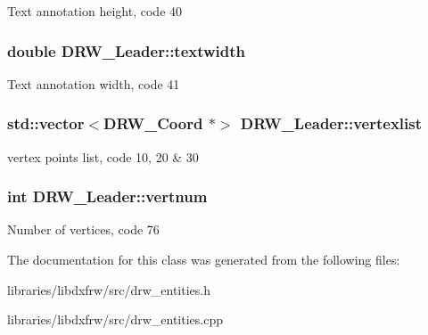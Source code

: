 Text annotation height, code 40 \hypertarget{classDRW__Leader_ab08450146f7f0658eca773a534d64be0}{
\subsubsection[{textwidth}]{\setlength{\rightskip}{0pt plus 5cm}double D\-R\-W\-\_\-\-Leader\-::textwidth}}\label{classDRW__Leader_ab08450146f7f0658eca773a534d64be0}
Text annotation width, code 41 \hypertarget{classDRW__Leader_a7aef5bd8c0202b0c6836e15552866fcd}{
\subsubsection[{vertexlist}]{\setlength{\rightskip}{0pt plus 5cm}std\-::vector$<${\bf D\-R\-W\-\_\-\-Coord} $\ast$$>$ D\-R\-W\-\_\-\-Leader\-::vertexlist}}\label{classDRW__Leader_a7aef5bd8c0202b0c6836e15552866fcd}
vertex points list, code 10, 20 \& 30 \hypertarget{classDRW__Leader_a8c0f8d7ebce1a2f1a4cb6d367a0c6a0d}{
\subsubsection[{vertnum}]{\setlength{\rightskip}{0pt plus 5cm}int D\-R\-W\-\_\-\-Leader\-::vertnum}}\label{classDRW__Leader_a8c0f8d7ebce1a2f1a4cb6d367a0c6a0d}
Number of vertices, code 76 

The documentation for this class was generated from the following files\-:\begin{DoxyCompactItemize}
\item 
libraries/libdxfrw/src/drw\-\_\-entities.\-h\item 
libraries/libdxfrw/src/drw\-\_\-entities.\-cpp\end{DoxyCompactItemize}
